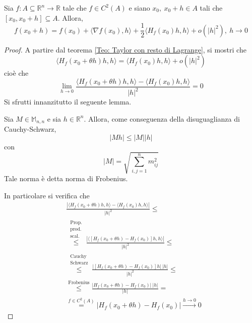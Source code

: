 \begin{theorem} \label{Teo: Taylor con resto di Peano}
    Sia $f: A \subseteq \mathbb{R}^n \to \mathbb{R}$ tale che $f \in C^2(A)$ e siano $x_0,\ x_0+h \in A$ tali che $[x_0, x_0+h] \subseteq A$. Allora, 
    \begin{equation}
        f(x_0+h)=f(x_0)+\langle \nabla f(x_0), h \rangle+ \frac{1}{2} \langle H_f(x_0)h, h\rangle + o(|h|^2),\ h \to 0 \label{Eq: Taylor con resto di Peano}
    \end{equation}
\end{theorem}
    \begin{proof}
        A partire dal teorema \ref{Teo: Taylor con resto di Lagrange}, si mostri che 
        \begin{equation*}
            \langle H_f(x_0+\theta h)h, h \rangle = \langle H_f(x_0)h,h \rangle + o(|h|^2)
        \end{equation*}
        cioè che 
        \begin{equation*}
            \lim_{h\to 0}{\frac{\langle H_f(x_0+\theta h)h, h \rangle - \langle H_f(x_0)h, h \rangle}{|h|^2}}=0
        \end{equation*}
        Si sfrutti innanzitutto il seguente lemma.
        \begin{lemma}
            Sia $M \in \mathbb{M}_{n,n}$ e sia $h \in \mathbb{R}^n$. Allora, come conseguenza della disuguaglianza di Cauchy-Schwarz, 
            \begin{equation*}
                |Mh| \leq |M| |h|
            \end{equation*}
            con 
            \begin{equation} \label{Eq: Norma di Frobenius}
                |M|=\sqrt{\sum\limits_{i,j=1}^{n}{m_{ij}^2}}
            \end{equation}
            Tale norma è detta norma di Frobenius.
        \end{lemma}
        In particolare si verifica che
        \begin{equation*}
            \begin{aligned}
                &\frac{|\langle H_f(x_0+\theta h)h, h \rangle - \langle H_f(x_0)h, h\rangle|}{|h|^2}\leq\\
                &\overset{\substack{\text{Prop.}\\\text{prod.}\\ \text{scal.}}}{\leq}\frac{|\langle [H_f(x_0+\theta h)-H_f(x_0)]h, h \rangle|}{|h|^2} \leq\\
                &\overset{\substack{\text{Cauchy}\\\text{Schwarz}}}{\leq} \frac{|[H_f(x_0+\theta h)-H_f(x_0)]h|\ |h|}{|h|^2} \leq\\
                &\overset{\text{Frobenius}}{\leq} \frac{|H_f(x_0+\theta h)-H_f(x_0)|\ |h|}{|h|} =\\
                &\overset{f \in C^2(A)}{=}|H_f(x_0+\theta h)-H_f(x_0)| \xrightarrow{h \to 0} 0
            \end{aligned}
        \end{equation*}
    \end{proof}

